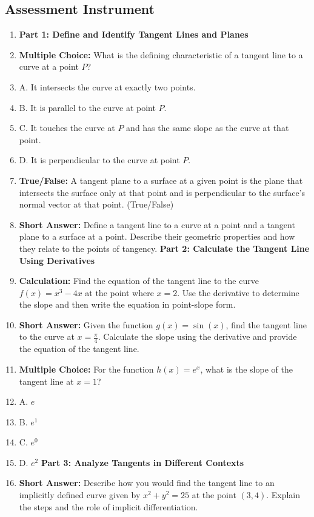 {{{{\subsection{Assessment Instrument}

\begin{enumerate}
    \item \textbf{Part 1: Define and Identify Tangent Lines and Planes}
    \item \textbf{Multiple Choice:} What is the defining characteristic of a tangent line to a curve at a point $P$?
    \item A. It intersects the curve at exactly two points.
    \item B. It is parallel to the curve at point $P$.
    \item C. It touches the curve at $P$ and has the same slope as the curve at that point.
    \item D. It is perpendicular to the curve at point $P$.
    \item \textbf{True/False:} A tangent plane to a surface at a given point is the plane that intersects the surface only at that point and is perpendicular to the surface's normal vector at that point. (True/False)
    \item \textbf{Short Answer:} Define a tangent line to a curve at a point and a tangent plane to a surface at a point. Describe their geometric properties and how they relate to the points of tangency. \textbf{Part 2: Calculate the Tangent Line Using Derivatives}
    \item \textbf{Calculation:} Find the equation of the tangent line to the curve $f(x) = x^3 - 4x$ at the point where $x = 2$. Use the derivative to determine the slope and then write the equation in point-slope form.
    \item \textbf{Short Answer:} Given the function $g(x) = \sin(x)$, find the tangent line to the curve at $x = \frac{\pi}{4}$. Calculate the slope using the derivative and provide the equation of the tangent line.
    \item \textbf{Multiple Choice:} For the function $h(x) = e^x$, what is the slope of the tangent line at $x = 1$?
    \item A. $e$
    \item B. $e^1$
    \item C. $e^0$
    \item D. $e^2$ \textbf{Part 3: Analyze Tangents in Different Contexts}
    \item \textbf{Short Answer:} Describe how you would find the tangent line to an implicitly defined curve given by $x^2 + y^2 = 25$ at the point $(3, 4)$. Explain the steps and the role of implicit differentiation.

\end{enumerate}}}}}
